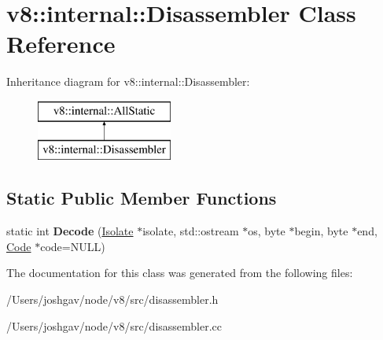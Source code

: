 \hypertarget{classv8_1_1internal_1_1_disassembler}{}\section{v8\+:\+:internal\+:\+:Disassembler Class Reference}
\label{classv8_1_1internal_1_1_disassembler}
Inheritance diagram for v8\+:\+:internal\+:\+:Disassembler\+:\begin{figure}[H]
\begin{center}
\leavevmode
\includegraphics[height=2.000000cm]{classv8_1_1internal_1_1_disassembler}
\end{center}
\end{figure}
\subsection*{Static Public Member Functions}
\begin{DoxyCompactItemize}
\item 
static int {\bfseries Decode} (\hyperlink{classv8_1_1internal_1_1_isolate}{Isolate} $\ast$isolate, std\+::ostream $\ast$os, byte $\ast$begin, byte $\ast$end, \hyperlink{classv8_1_1internal_1_1_code}{Code} $\ast$code=N\+U\+LL)\hypertarget{classv8_1_1internal_1_1_disassembler_a50445d58e3851346831620254a0f40ed}{}\label{classv8_1_1internal_1_1_disassembler_a50445d58e3851346831620254a0f40ed}

\end{DoxyCompactItemize}


The documentation for this class was generated from the following files\+:\begin{DoxyCompactItemize}
\item 
/\+Users/joshgav/node/v8/src/disassembler.\+h\item 
/\+Users/joshgav/node/v8/src/disassembler.\+cc\end{DoxyCompactItemize}

